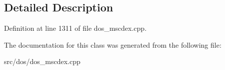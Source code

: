 \subsection{Detailed Description}


Definition at line 1311 of file dos\-\_\-mscdex.\-cpp.



The documentation for this class was generated from the following file\-:\begin{DoxyCompactItemize}
\item 
src/dos/dos\-\_\-mscdex.\-cpp\end{DoxyCompactItemize}
